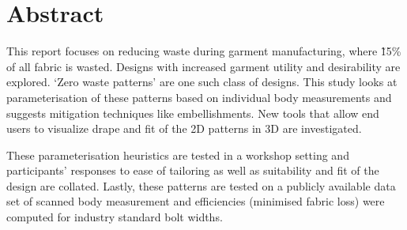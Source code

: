 \chapter*{Abstract}

This report focuses on reducing waste during garment manufacturing, where \~15\% of all fabric is wasted. Designs with increased garment utility and desirability are explored. ‘Zero waste patterns’ are one such class of designs. This study looks at parameterisation of these patterns based on individual body measurements and suggests mitigation techniques like embellishments. New tools that allow end users to visualize drape and fit of the 2D patterns in 3D are investigated.

These parameterisation heuristics are tested in a workshop setting and participants’ responses to ease of tailoring as well as suitability and fit of the design are collated. Lastly, these patterns are tested on a publicly available data set of scanned body measurement and efficiencies (minimised fabric loss) were computed for industry standard bolt widths. 

